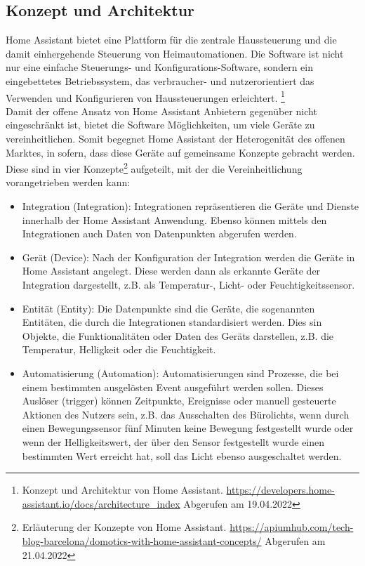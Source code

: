 \subsection{Konzept und Architektur}
\label{sec:conceptArchitectureHAOS}
    Home Assistant bietet eine Plattform für die zentrale Haussteuerung und die damit einhergehende Steuerung von Heimautomationen. Die 
    Software ist nicht nur eine einfache Steuerungs- und Konfigurations-Software, sondern ein eingebettetes Betriebssystem, das 
    verbraucher- und nutzerorientiert das Verwenden und Konfigurieren von Haussteuerungen erleichtert. \footnote{Konzept und Architektur von Home Assistant. \url{https://developers.home-assistant.io/docs/architecture_index} Abgerufen am 19.04.2022}
    \\
    \linebreak
    Damit der offene Ansatz von Home Assistant Anbietern gegenüber nicht eingeschränkt ist, bietet die Software Möglichkeiten, um viele 
    Geräte zu vereinheitlichen. Somit begegnet Home Assistant der Heterogenität des offenen Marktes, in sofern, dass diese Geräte auf  
    gemeinsame Konzepte gebracht werden. Diese sind in vier Konzepte\footnote{Erläuterung der Konzepte von Home Assistant. \url{https://apiumhub.com/tech-blog-barcelona/domotics-with-home-assistant-concepts/} Abgerufen am 21.04.2022} 
    aufgeteilt, mit der die Vereinheitlichung vorangetrieben werden kann: 
    \begin{itemize}
        \item Integration (Integration): Integrationen repräsentieren die Geräte und Dienste innerhalb der Home Assistant Anwendung. 
              Ebenso können mittels den Integrationen auch Daten von Datenpunkten abgerufen werden.
        \item Gerät (Device): Nach der Konfiguration der Integration werden die Geräte in Home Assistant angelegt. 
              Diese werden dann als erkannte Geräte der Integration dargestellt, z.B. als Temperatur-, Licht- oder Feuchtigkeitssensor.
        \item Entität (Entity): Die Datenpunkte sind die Geräte, die sogenannten Entitäten, die durch die Integrationen standardisiert werden. 
              Dies sin Objekte, die Funktionalitäten oder Daten des Geräts darstellen, z.B. die Temperatur, Helligkeit oder die Feuchtigkeit.
        \item Automatisierung (Automation): Automatisierungen sind Prozesse, die bei einem bestimmten ausgelösten Event ausgeführt werden 
              sollen. Dieses Auslöser (trigger) können Zeitpunkte, Ereignisse oder manuell gesteuerte Aktionen des Nutzers sein, z.B. das 
              Ausschalten des Bürolichts, wenn durch einen Bewegungssensor fünf Minuten keine Bewegung festgestellt wurde oder wenn der 
              Helligkeitswert, der über den Sensor festgestellt wurde einen bestimmten Wert erreicht hat, soll das Licht ebenso 
              ausgeschaltet werden.
    \end{itemize}
